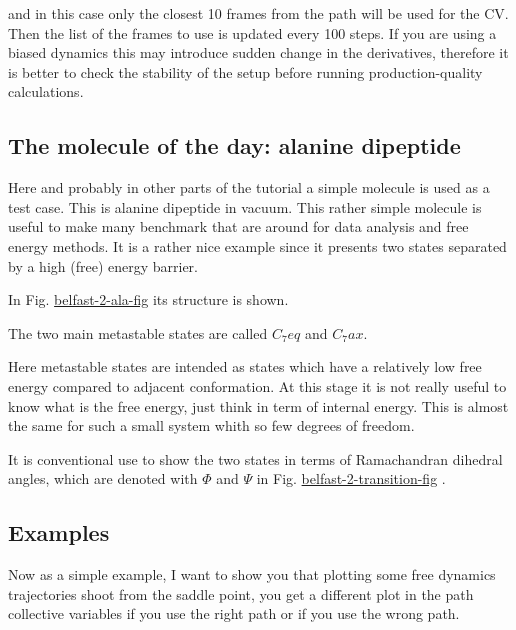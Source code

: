 and in this case only the closest 10 frames from the path will be used for the C\+V. Then the list of the frames to use is updated every 100 steps. If you are using a biased dynamics this may introduce sudden change in the derivatives, therefore it is better to check the stability of the setup before running production-\/quality calculations.\hypertarget{belfast-2_belfast-2-ala}{}\subsection{The molecule of the day\+: alanine dipeptide}\label{belfast-2_belfast-2-ala}
Here and probably in other parts of the tutorial a simple molecule is used as a test case. This is alanine dipeptide in vacuum. This rather simple molecule is useful to make many benchmark that are around for data analysis and free energy methods. It is a rather nice example since it presents two states separated by a high (free) energy barrier.

In Fig. \hyperlink{belfast-2_belfast-2-ala-fig}{belfast-\/2-\/ala-\/fig} its structure is shown.

\label{belfast-2_belfast-2-ala-fig}%
\hypertarget{belfast-2_belfast-2-ala-fig}{}%
 The two main metastable states are called $ C_7eq $ and $ C_7ax $.

\label{belfast-2_belfast-2-transition-fig}%
\hypertarget{belfast-2_belfast-2-transition-fig}{}%
 Here metastable states are intended as states which have a relatively low free energy compared to adjacent conformation. At this stage it is not really useful to know what is the free energy, just think in term of internal energy. This is almost the same for such a small system whith so few degrees of freedom.

It is conventional use to show the two states in terms of Ramachandran dihedral angles, which are denoted with $ \Phi $ and $ \Psi $ in Fig. \hyperlink{belfast-2_belfast-2-transition-fig}{belfast-\/2-\/transition-\/fig} .

\label{belfast-2_belfast-2-rama-fig}%
\hypertarget{belfast-2_belfast-2-rama-fig}{}%
\hypertarget{belfast-2_belfast-2-examples}{}\subsection{Examples}\label{belfast-2_belfast-2-examples}
Now as a simple example, I want to show you that plotting some free dynamics trajectories shoot from the saddle point, you get a different plot in the path collective variables if you use the right path or if you use the wrong path.

